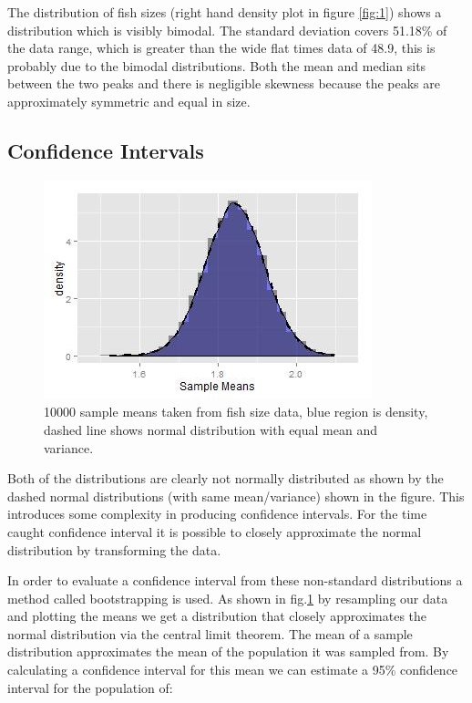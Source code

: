 \documentclass{article}
\begin{document}
The distribution of fish sizes (right hand density plot in figure \ref{fig:1}) shows a distribution which is visibly bimodal. The standard deviation covers 51.18\% of the data range, which is greater than the wide flat times data of 48.9, this is probably due to the bimodal distributions. Both the mean and median sits between the two peaks and there is negligible skewness because the peaks are approximately symmetric and equal in size. 

\subsection{Confidence Intervals}


\begin{figure}
  \includegraphics[width=0.9\linewidth]{figure3.jpg}
  \caption{10000 sample means taken from fish size data, blue region is density, dashed line shows normal distribution with equal mean and variance.}
  \label{fig:three}
\end{figure}

Both of the distributions are clearly not normally distributed as shown by the dashed normal distributions (with same mean/variance) shown in the figure. This introduces some complexity in producing confidence intervals. For the time caught confidence interval it is possible to closely approximate the normal distribution by transforming the data.

In order to evaluate a confidence interval from these non-standard distributions a method called bootstrapping is used. As shown in fig.\ref{fig:three} by resampling our data and plotting the means we get a distribution that closely approximates the normal distribution via the central limit theorem. The mean of a sample distribution approximates the mean of the population it was sampled from. By calculating a confidence interval for this mean we can estimate a 95\% confidence interval for the population of:
\end{document}
